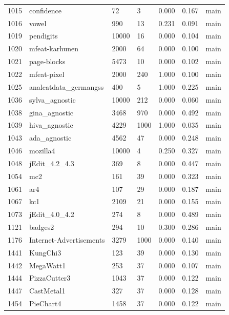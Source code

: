 \begin{table}[!htb]
\begin{tabular}{l | l | l | l | l | l | l}
1015 & confidence & 72 & 3 & 0.000 & 0.167 & main \\
1016 & vowel & 990 & 13 & 0.231 & 0.091 & main \\
1019 & pendigits & 10000 & 16 & 0.000 & 0.104 & main \\
1020 & mfeat-karhunen & 2000 & 64 & 0.000 & 0.100 & main \\
1021 & page-blocks & 5473 & 10 & 0.000 & 0.102 & main \\
1022 & mfeat-pixel & 2000 & 240 & 1.000 & 0.100 & main \\
1025 & analcatdata\_germangss & 400 & 5 & 1.000 & 0.225 & main \\
1036 & sylva\_agnostic & 10000 & 212 & 0.000 & 0.060 & main \\
1038 & gina\_agnostic & 3468 & 970 & 0.000 & 0.492 & main \\
1039 & hiva\_agnostic & 4229 & 1000 & 1.000 & 0.035 & main \\
1043 & ada\_agnostic & 4562 & 47 & 0.000 & 0.248 & main \\
1046 & mozilla4 & 10000 & 4 & 0.250 & 0.327 & main \\
1048 & jEdit\_4.2\_4.3 & 369 & 8 & 0.000 & 0.447 & main \\
1054 & mc2 & 161 & 39 & 0.000 & 0.323 & main \\
1061 & ar4 & 107 & 29 & 0.000 & 0.187 & main \\
1067 & kc1 & 2109 & 21 & 0.000 & 0.155 & main \\
1073 & jEdit\_4.0\_4.2 & 274 & 8 & 0.000 & 0.489 & main \\
1121 & badges2 & 294 & 10 & 0.300 & 0.286 & main \\
1176 & Internet-Advertisements & 3279 & 1000 & 0.000 & 0.140 & main \\
1441 & KungChi3 & 123 & 39 & 0.000 & 0.130 & main \\
1442 & MegaWatt1 & 253 & 37 & 0.000 & 0.107 & main \\
1444 & PizzaCutter3 & 1043 & 37 & 0.000 & 0.122 & main \\
1447 & CastMetal1 & 327 & 37 & 0.000 & 0.128 & main \\
1454 & PieChart4 & 1458 & 37 & 0.000 & 0.122 & main \\
\end{tabular}
\end{table}
